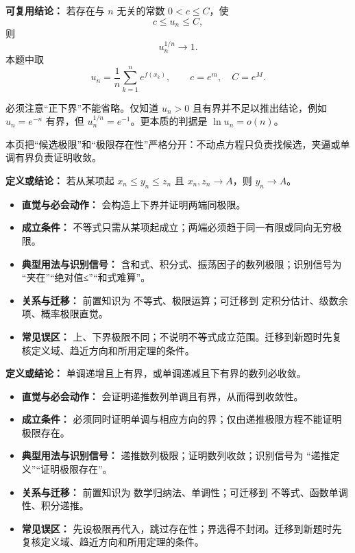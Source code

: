 \begin{knowledgeBox}
\textbf{可复用结论：} 若存在与 $n$ 无关的常数 $0<c\le C$，使
\[
c\le u_n\le C,
\]
则
\[
u_n^{1/n}\to1.
\]
本题中取
\[
u_n=\frac1n\sum_{k=1}^{n}e^{f(x_k)},
\qquad c=e^m,\quad C=e^M.
\]

必须注意“正下界”不能省略。仅知道 $u_n>0$ 且有界并不足以推出结论，例如
$u_n=e^{-n}$ 有界，但 $u_n^{1/n}=e^{-1}$。更本质的判据是
$\ln u_n=o(n)$。
\end{knowledgeBox}


\begin{knowledgeBox}
本页把“候选极限”和“极限存在性”严格分开：不动点方程只负责找候选，夹逼或单调有界负责证明收敛。
\end{knowledgeBox}

\begin{knowledgeBox}
\textbf{定义或结论：} 若从某项起 $x_n\le y_n\le z_n$ 且 $x_n,z_n\to A$，则 $y_n\to A$。

\begin{itemize}
  \item \textbf{直觉与必会动作：} 会构造上下界并证明两端同极限。
  \item \textbf{成立条件：} 不等式只需从某项起成立；两端必须趋于同一有限或同向无穷极限。
  \item \textbf{典型用法与识别信号：} 含和式、积分式、振荡因子的数列极限；识别信号为 “夹在”“绝对值≤”“和式难算”。
  \item \textbf{关系与迁移：} 前置知识为 不等式、极限运算；可迁移到 定积分估计、级数余项、概率极限直觉。
  \item \textbf{常见误区：} 上、下界极限不同；不说明不等式成立范围。迁移到新题时先复核定义域、趋近方向和所用定理的条件。
\end{itemize}
\end{knowledgeBox}

\begin{knowledgeBox}
\textbf{定义或结论：} 单调递增且上有界，或单调递减且下有界的数列必收敛。

\begin{itemize}
  \item \textbf{直觉与必会动作：} 会证明递推数列单调且有界，从而得到收敛性。
  \item \textbf{成立条件：} 必须同时证明单调与相应方向的界；仅由递推极限方程不能证明极限存在。
  \item \textbf{典型用法与识别信号：} 递推数列极限；证明数列收敛；识别信号为 “递推定义”“证明极限存在”。
  \item \textbf{关系与迁移：} 前置知识为 数学归纳法、单调性；可迁移到 不等式、函数单调性、积分递推。
  \item \textbf{常见误区：} 先设极限再代入，跳过存在性；界选得不封闭。迁移到新题时先复核定义域、趋近方向和所用定理的条件。
\end{itemize}
\end{knowledgeBox}

